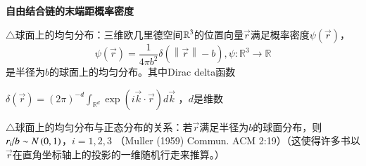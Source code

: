\documentclass{article} %
\begin{document}
\noindent 

\noindent \textbf{自由结合链的末端距概率密度}

\noindent $\mathrm{\triangle}$球面上的均匀分布：三维欧几里德空间${\mathbb R}^{{\rm 3}} $的位置向量$\vec{r}$满足概率密度$\psi \left(\vec{r}\right)$，
\[\psi \left(\vec{r}\right)=\frac{1}{4\pi b^{2} } \delta \left(\left\| \vec{r}\right\| -b\right),\psi :\mathrm{{\mathbb R}}^{3} \to \mathrm{{\mathbb R}}\] 
是半径为$b$的球面上的均匀分布。其中Dirac delta函数

 $\delta \left(\vec{r}\right)=\left(2\pi \right)^{-d} \int _{{\mathbb R}^{d} }\exp \left(i\vec{k}\cdot \vec{r}\right) d\vec{k}$ ，$d$是维数

\noindent $\mathrm{\triangle}$球面上的均匀分布与正态分布的关系：若$\vec{r}$满足半径为$b$的球面分布，则${r_{i} \mathord{\left/ {\vphantom {r_{i}  b}} \right. \kern-\nulldelimiterspace} b} \sim N\left(0,1\right)$，$i=1,2,3$ （Muller (1959) Commun. ACM 2:19）（这使得许多书以$\vec{r}$在直角坐标轴上的投影的一维随机行走来推算。）
\end{document}
